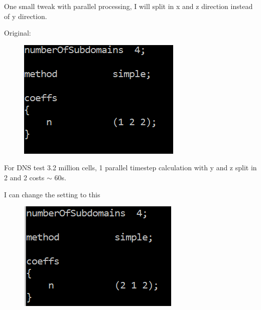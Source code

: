 \documentclass[12pt]{article}
\renewcommand{\_}{\kern-1.5pt\textunderscore\kern-1.5pt}
\begin{document}
One small tweak with parallel processing, I will split in x and z direction instead of y direction.\par

Original:\par




\begin{figure}[H]
	\begin{Center}
		\includegraphics[width=3.09in,height=2.26in]{./media/image24.png}
	\end{Center}
\end{figure}



\par

For DNS test 3.2 million cells, 1 parallel timestep calculation with y and z split in 2 and 2 costs $ \sim $ 60s.\par

I can change the setting to this\par




\begin{figure}[H]
	\begin{Center}
		\includegraphics[width=3.05in,height=2.07in]{./media/image25.png}
	\end{Center}
\end{figure}
\end{document}
